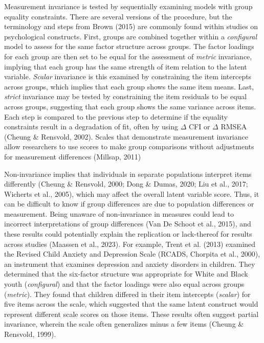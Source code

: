 \documentclass[
  english,
  man]{apa7}
\begin{document}
Measurement invariance is tested by sequentially examining models with group equality constraints. There are several versions of the procedure, but the terminology and steps from Brown (2015) are commonly found within studies on psychological constructs. First, groups are combined together within a \emph{configural} model to assess for the same factor structure across groups. The factor loadings for each group are then set to be equal for the assessment of \emph{metric} invariance, implying that each group has the same strength of item relation to the latent variable. \emph{Scalar} invariance is this examined by constraining the item intercepts across groups, which implies that each group shows the same item means. Last, \emph{strict} invariance may be tested by constraining the item residuals to be equal across groups, suggesting that each group shows the same variance across items. Each step is compared to the previous step to determine if the equality constraints result in a degradation of fit, often by using \(\Delta\) CFI or \(\Delta\) RMSEA (Cheung \& Rensvold, 2002). Scales that demonstrate measurement invariance allow researchers to use scores to make group comparisons without adjustments for measurement differences (Millsap, 2011)

Non-invariance implies that individuals in separate populations interpret items differently (Cheung \& Rensvold, 2000; Dong \& Dumas, 2020; Liu et al., 2017; Wicherts et al., 2005), which may affect the overall latent variable score. Thus, it can be difficult to know if group differences are due to population differences or measurement. Being unaware of non-invariance in measures could lead to incorrect interpretations of group differences (Van De Schoot et al., 2015), and these results could potentially explain the replication or lack-thereof for results across studies (Maassen et al., 2023). For example, Trent et al. (2013) examined the Revised Child Anxiety and Depression Scale (RCADS, Chorpita et al., 2000), an instrument that examines depression and anxiety disorders in children. They determined that the six-factor structure was appropriate for White and Black youth (\emph{configural}) and that the factor loadings were also equal across groups (\emph{metric}). They found that children differed in their item intercepts (\emph{scalar}) for five items across the scale, which suggested that the same latent construct would represent different scale scores on those items. These results often suggest partial invariance, wherein the scale often generalizes minus a few items (Cheung \& Rensvold, 1999).
\end{document}
